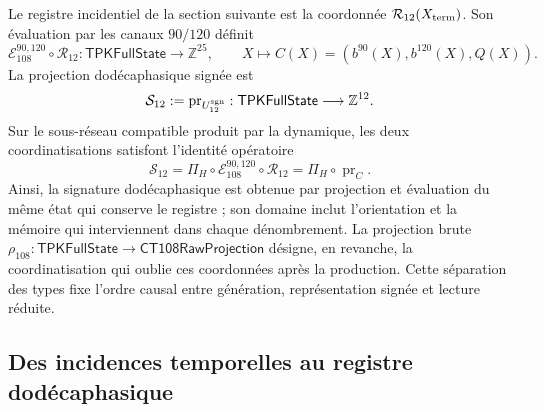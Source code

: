 Le registre incidentiel de la section suivante est la coordonnée
\(\mathcal R_{12}(X_{\rm term})\). Son évaluation par les canaux
\(90/120\) définit
\[
 \mathcal E_{108}^{90,120}\circ\mathcal R_{12}:
 \mathsf{TPKFullState}\longrightarrow\mathbb Z^{25},
 \qquad
 X\longmapsto C(X)=(b^{90}(X),b^{120}(X),Q(X)).
\]
La projection dodécaphasique signée est
\[
 \mathcal S_{12}:=\operatorname{pr}_{U_{12}^{\rm sgn}}:
 \mathsf{TPKFullState}\longrightarrow\mathbb Z^{12}.
\]
Sur le sous-réseau compatible produit par la dynamique, les deux coordinatisations
satisfont l’identité opératoire
\begin{equation}
 \mathcal S_{12}
 =\Pi_H\circ\mathcal E_{108}^{90,120}\circ\mathcal R_{12}
 =\Pi_H\circ\operatorname{pr}_{C}.
 \label{vi:dep:identidad-productor-e108}
\end{equation}
Ainsi, la signature dodécaphasique est obtenue par projection et évaluation du même
état qui conserve le registre ; son domaine inclut l’orientation et la mémoire
qui interviennent dans chaque dénombrement. La projection brute
\(\rho_{108}:\mathsf{TPKFullState}\to\mathsf{CT108RawProjection}\)
désigne, en revanche, la coordinatisation qui oublie ces coordonnées après la
production. Cette séparation des types fixe l’ordre causal entre génération,
représentation signée et lecture réduite.

\subsection{Des incidences temporelles au registre dodécaphasique}
\label{vi:dep:registro}\label{subsec:k-registro-integral}

